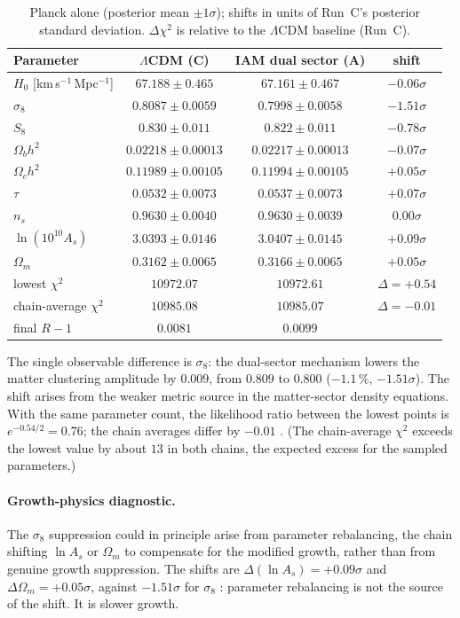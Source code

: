 \begin{table}[htbp]\centering\small
\caption{Planck alone (posterior mean $\pm1\sigma$); shifts in units of Run~C's posterior standard deviation. $\Delta\chi^2$ is relative to the
$\Lambda$CDM baseline (Run~C). \measured}\label{tab:l2_planck}
\begin{tabular}{lccc}\hline
Parameter & $\Lambda$CDM (C) & IAM dual sector (A) & shift\\\hline
$H_0$ [km\,s$^{-1}$\,Mpc$^{-1}$] & $67.188\pm0.465$ & $67.161\pm0.467$ & $-0.06\sigma$\\
$\sigma_8$ & $0.8087\pm0.0059$ & $0.7998\pm0.0058$ & $-1.51\sigma$\\
$S_8$ & $0.830\pm0.011$ & $0.822\pm0.011$ & $-0.78\sigma$\\
$\Omega_bh^2$ & $0.02218\pm0.00013$ & $0.02217\pm0.00013$ & $-0.07\sigma$\\
$\Omega_ch^2$ & $0.11989\pm0.00105$ & $0.11994\pm0.00105$ & $+0.05\sigma$\\
$\tau$ & $0.0532\pm0.0073$ & $0.0537\pm0.0073$ & $+0.07\sigma$\\
$n_s$ & $0.9630\pm0.0040$ & $0.9630\pm0.0039$ & $0.00\sigma$\\
$\ln(10^{10}A_s)$ & $3.0393\pm0.0146$ & $3.0407\pm0.0145$ & $+0.09\sigma$\\
$\Omega_m$ & $0.3162\pm0.0065$ & $0.3166\pm0.0065$ & $+0.05\sigma$\\\hline
lowest $\chi^2$ & $10972.07$ & $10972.61$ & $\Delta=+0.54$\\
chain-average $\chi^2$ & $10985.08$ & $10985.07$ & $\Delta=-0.01$\\
final $R-1$ & $0.0081$ & $0.0099$ & \\\hline
\end{tabular}\end{table}

The single observable difference is $\sigma_8$: the dual-sector mechanism lowers the matter clustering amplitude by $0.009$, from $0.809$ to $0.800$
($-1.1\,\%$, $-1.51\sigma$). The shift arises from the weaker metric source in the matter-sector density equations. With the same parameter count,
the likelihood ratio between the lowest points is $e^{-0.54/2}=0.76$; the chain averages differ by $-0.01$ \measured. (The chain-average $\chi^2$
exceeds the lowest value by about $13$ in both chains, the expected excess for the sampled parameters.)

\paragraph{Growth-physics diagnostic.} The $\sigma_8$ suppression could in principle arise from parameter rebalancing, the chain shifting $\ln A_s$ or
$\Omega_m$ to compensate for the modified growth, rather than from genuine growth suppression. The shifts are $\Delta(\ln A_s)=+0.09\sigma$ and
$\Delta\Omega_m=+0.05\sigma$, against $-1.51\sigma$ for $\sigma_8$ \measured: parameter rebalancing is not the source of the shift. It is slower growth.

